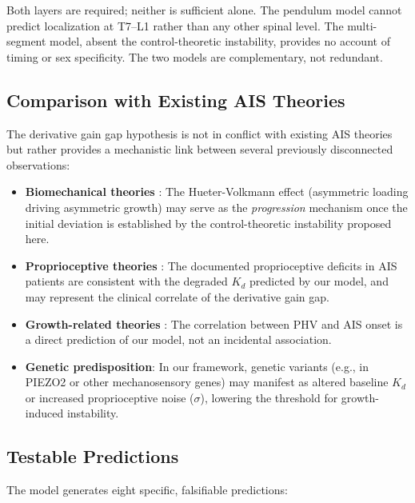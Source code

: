 \documentclass[12pt,a4paper]{article}
\begin{document}
Both layers are required; neither is sufficient alone. The pendulum model cannot predict localization at T7--L1 rather than any other spinal level. The multi-segment model, absent the control-theoretic instability, provides no account of timing or sex specificity. The two models are complementary, not redundant.

\subsection{Comparison with Existing AIS Theories}

The derivative gain gap hypothesis is not in conflict with existing AIS theories but rather provides a mechanistic link between several previously disconnected observations:

\begin{itemize}
\item \textbf{Biomechanical theories} \citep{stokes2006hueter, villemure2009growth}: The Hueter-Volkmann effect (asymmetric loading driving asymmetric growth) may serve as the \textit{progression} mechanism once the initial deviation is established by the control-theoretic instability proposed here.

\item \textbf{Proprioceptive theories} \citep{lao2008proprioceptive, simoneau2006altered}: The documented proprioceptive deficits in AIS patients are consistent with the degraded $K_d$ predicted by our model, and may represent the clinical correlate of the derivative gain gap.

\item \textbf{Growth-related theories} \citep{sanders2017maturity, burwell2009aetiopathogenesis}: The correlation between PHV and AIS onset is a direct prediction of our model, not an incidental association.

\item \textbf{Genetic predisposition}: In our framework, genetic variants (e.g., in PIEZO2 or other mechanosensory genes) may manifest as altered baseline $K_d$ or increased proprioceptive noise ($\sigma$), lowering the threshold for growth-induced instability.
\end{itemize}

\subsection{Testable Predictions}

The model generates eight specific, falsifiable predictions:
\end{document}
